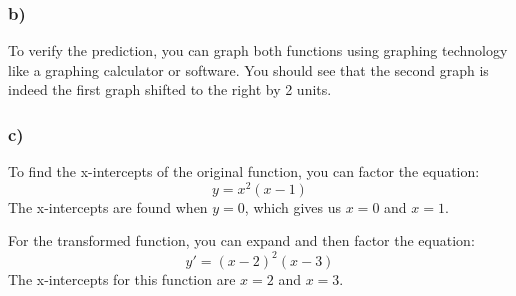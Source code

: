 \documentclass{article}
\begin{document}
\begin{itemize}
\subsubsection*{b)}
To verify the prediction, you can graph both functions using graphing technology like a graphing calculator or software. You should see that the second graph is indeed the first graph shifted to the right by 2 units.

\subsubsection*{c)}
To find the x-intercepts of the original function, you can factor the equation:
\[ y = x^2(x - 1) \]
The x-intercepts are found when \( y = 0 \), which gives us \( x = 0 \) and \( x = 1 \).

For the transformed function, you can expand and then factor the equation:
\[ y' = (x - 2)^2(x - 3) \]
The x-intercepts for this function are \( x = 2 \) and \( x = 3 \).

\end{itemize}
\end{document}
